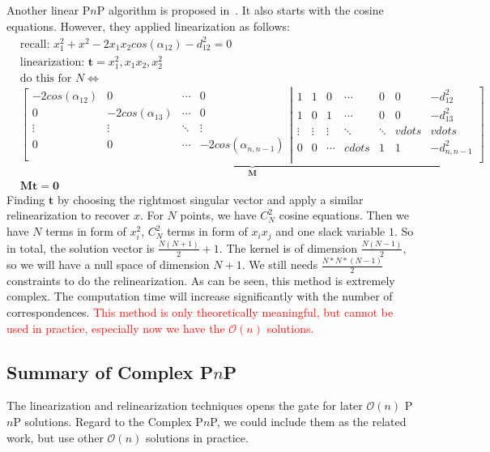 \documentclass[a4paper]{report}
\begin{document}
Another linear P$n$P algorithm is proposed in~\cite{ansar2003linear}. It also starts with the cosine equations. However, they applied linearization as follows:
\begin{align*}
&\text{recall: } x_1^2+x^2-2x_1x_2cos(\alpha_{12})-d_{12}^2=0 \\
&\text{linearization: $\mathbf{t}={x_1^2, x_1x_2, x_2^2}$} \\
&\text{do this for $N$} \Leftrightarrow \\
&\underbrace{
\left[
\begin{matrix}
-2cos(\alpha_{12}) & 0 & \cdots & 0 \\
0 & -2cos(\alpha_{13}) & \cdots & 0 \\
\vdots & \vdots & \ddots & \vdots \\
0 & 0 & \cdots & -2cos(\alpha_{n, n-1})\\
\end{matrix}
\right.
\left|
\begin{matrix}
1 & 1 & 0 & \cdots & 0 & 0 & -d_{12}^2\\
1 & 0 & 1 & \cdots & 0 & 0 & -d_{13}^2\\
\vdots & \vdots & \vdots& \ddots & \ddots & vdots & vdots \\
0 & 0 & \cdots & cdots & 1 & 1 & -d_{n, n-1}^2\\
\end{matrix}
\right]
}_{\mathbf{M}} \\
&\mathbf{M}\mathbf{t} = \mathbf{0}
\end{align*}
Finding $\mathbf{t}$ by choosing the rightmost singular vector and apply a similar relinearization to recover $x$. For $N$ points, we have $C_{N}^2$ cosine equations. Then we have $N$ terms in form of $x_i^2$, $C_{N}^2$ terms in form of $x_ix_j$ and one slack variable $1$. So in total, the solution vector is $\frac{N(N+1)}{2}+1$. The kernel is of dimension $\frac{N(N-1)}{2}$, so we will have a null space of dimension $N+1$. We still needs $\frac{N*N*(N-1)}{2}$ constraints to do the relinearization. As can be seen, this method is extremely complex. The computation time will increase significantly with the number of correspondences. \textcolor{red}{This method is only theoretically meaningful, but cannot be used in practice, especially now we have the $\mathcal{O}(n)$ solutions.}

\subsection{Summary of Complex P$n$P}
The linearization and relinearization techniques opens the gate for later $\mathcal{O}(n)$ P$n$P solutions. Regard to the Complex P$n$P, we could include them as the related work, but use other $\mathcal{O}(n)$ solutions in practice.
\end{document}
